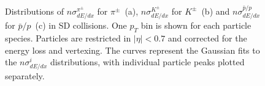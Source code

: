 \begin{figure}[H]
{			\begin{subfigure}[b]{\linewidth}{
					}
			\end{subfigure}
		}
	\caption[Distributions of $n\sigma^{\pi^\pm}_{dE/dx}$ for $\pi^\pm$, $n\sigma^{K^\pm}_{dE/dx}$ for $K^\pm$ and $n\sigma^{\bar{p}/p}_{dE/dx}$ for $\bar{p}/p$ in SD collisions]{Distributions of $n\sigma^{\pi^\pm}_{dE/dx}$ for $\pi^\pm$~(a), $n\sigma^{K^\pm}_{dE/dx}$ for $K^\pm$~(b) and $n\sigma^{\bar{p}/p}_{dE/dx}$ for $\bar{p}/p$~(c) in SD collisions. One $p_T$ bin is shown for each particle species. Particles are restricted in $|\eta| < 0.7$ and corrected for the energy loss and vertexing. The curves represent the Gaussian fits to the $n\sigma^{i}_{dE/dx}$ distributions, with individual particle peaks plotted separately.}
	\label{fig:nsigmafit}
\end{figure}